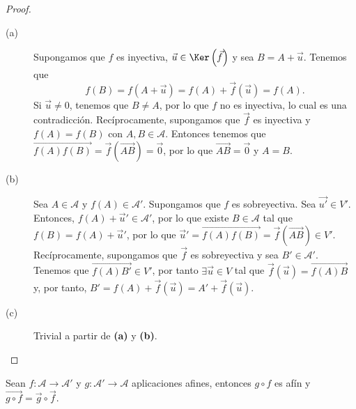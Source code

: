 \begin{proof}
\begin{description}
	\item[(a)] Supongamos que $\displaystyle f $ es inyectiva, $\displaystyle \vec{u} \in \Ker\left(\vec{f}\right)  $ y sea $\displaystyle B = A + \vec{u} $. Tenemos que 
	\[f\left(B\right) = f\left(A + \vec{u}\right) = f\left(A\right) + \vec{f}\left(\vec{u}\right) = f\left(A\right) .\]
	Si $\displaystyle \vec{u} \neq 0 $, tenemos que $\displaystyle B \neq A $, por lo que $\displaystyle f $ no es inyectiva, lo cual es una contradicción. Recíprocamente, supongamos que $\displaystyle \vec{f} $ es inyectiva y $\displaystyle f\left(A\right) = f\left(B\right) $ con $\displaystyle A,B \in \mathcal{A} $. Entonces tenemos que $\displaystyle \overrightarrow{f\left(A\right)f\left(B\right)} = \vec{f}\left(\overrightarrow{AB}\right) = \vec{0} $, por lo que $\displaystyle \overrightarrow{AB} = \vec{0} $ y $\displaystyle A = B $.
\item[(b)] Sea $\displaystyle A \in \mathcal{A} $ y $\displaystyle f\left(A\right) \in \mathcal{A}' $. Supongamos que $\displaystyle f $ es sobreyectiva. Sea $\displaystyle \vec{u'} \in V' $. Entonces, $\displaystyle f\left(A\right) + \vec{u}' \in \mathcal{A}' $, por lo que existe $\displaystyle B \in \mathcal{A} $ tal que $\displaystyle f\left(B\right) = f\left(A\right) + \vec{u}' $, por lo que $\displaystyle \vec{u}' = \overrightarrow{f\left(A\right)f\left(B\right)} = \vec{f}\left(\overrightarrow{AB}\right) \in V'$. \\
	Recíprocamente, supongamos que $\displaystyle \vec{f} $ es sobreyectiva y sea $\displaystyle B' \in \mathcal{A}' $. Tenemos que $\displaystyle \overrightarrow{f\left(A\right)B'} \in V'$, por tanto $\displaystyle \exists \vec{u} \in V $ tal que $\displaystyle \vec{f}\left(\vec{u}\right) = \overrightarrow{f\left(A\right)B} $ y, por tanto, $\displaystyle B' = f\left(A\right) + \vec{f}\left(\vec{u}\right) = A' + \vec{f}\left(\vec{u}\right) $.
\item[(c)] Trivial a partir de \textbf{(a)} y \textbf{(b)}.
\end{description}
\end{proof}
\begin{fprop}[]
	\normalfont Sean $\displaystyle f : \mathcal{A} \to \mathcal{A}' $ y $\displaystyle g : \mathcal{A'} \to \mathcal{A} $ aplicaciones afines, entonces $\displaystyle g\circ f $ es afín y $\displaystyle \overrightarrow{g \circ f} = \vec{g}\circ \vec{f} $.
\end{fprop}
